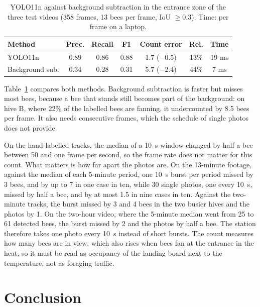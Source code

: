 \documentclass[english,hidelinks]{sbrt}
\begin{document}
\begin{table}[t]
\caption{YOLO11n against background subtraction in the entrance zone of the three test videos (358 frames, 13 bees per frame, IoU $\geq 0.3$). Time: per frame on a laptop.}
\label{tab:methods}
\centering
\footnotesize
\setlength{\tabcolsep}{3pt}
\begin{tabular}{lcccccc}
\hline
Method & Prec. & Recall & F1 & Count error & Rel. & Time \\
\hline
YOLO11n & 0.89 & 0.86 & 0.88 & 1.7 ($-$0.5) & 13\% & 19 ms \\
Background sub. & 0.34 & 0.28 & 0.31 & 5.7 ($-$2.4) & 44\% & 7 ms \\
\hline
\end{tabular}
\end{table}

Table~\ref{tab:methods} compares both methods. Background subtraction is faster but misses most bees, because a bee that stands still becomes part of the background: on hive B, where 22\% of the labelled bees are fanning, it undercounted by 8.5 bees per frame. It also needs consecutive frames, which the schedule of single photos does not provide.

On the hand-labelled tracks, the median of a 10~s window changed by half a bee between 50 and one frame per second, so the frame rate does not matter for this count. What matters is how far apart the photos are. On the 13-minute footage, against the median of each 5-minute period, one 10~s burst per period missed by 3 bees, and by up to 7 in one case in ten, while 30 single photos, one every 10~s, missed by half a bee, and by at most 1.5 in nine cases in ten. Against the two-minute tracks, the burst missed by 3 and 4 bees in the two busier hives and the photos by 1. On the two-hour video, where the 5-minute median went from 25 to 61 detected bees, the burst missed by 2 and the photos by half a bee. The station therefore takes one photo every 10~s instead of short bursts. The count measures how many bees are in view, which also rises when bees fan at the entrance in the heat, so it must be read as occupancy of the landing board next to the temperature, not as foraging traffic.

\section{Conclusion}
\label{sec:conclusion}
\end{document}
